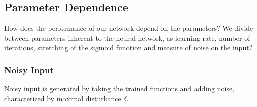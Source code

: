 \documentclass[useAMS,usenatbib]{mn2e}
\begin{document}
\subsection{Parameter Dependence}
How does the performance of our network depend on the parameters? We
divide between parameters inherent to the neural network, as learning
rate, number of iterations, stretching of the sigmoid function and
measure of noise on the input?

\subsubsection{Noisy Input}
Noisy input is generated by taking the trained functions and adding noise, characterized by maximal disturbance $\delta$.
\end{document}
